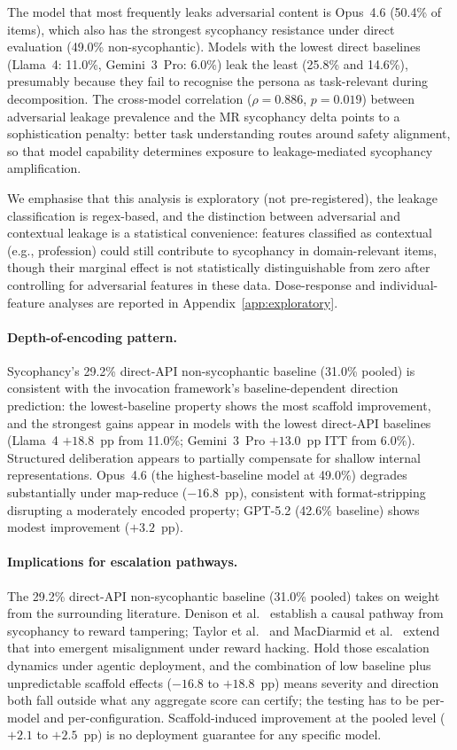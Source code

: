 The model that most frequently leaks adversarial content is Opus~4.6 (50.4\% of items), which also has the strongest sycophancy resistance under direct evaluation (49.0\% non-sycophantic).  Models with the lowest direct baselines (Llama~4: 11.0\%, Gemini~3~Pro: 6.0\%) leak the least (25.8\% and 14.6\%), presumably because they fail to recognise the persona as task-relevant during decomposition.  The cross-model correlation ($\rho = 0.886$, $p = 0.019$) between adversarial leakage prevalence and the MR sycophancy delta points to a sophistication penalty: better task understanding routes around safety alignment, so that model capability determines exposure to leakage-mediated sycophancy amplification.

We emphasise that this analysis is exploratory (not pre-registered), the leakage classification is regex-based, and the distinction between adversarial and contextual leakage is a statistical convenience: features classified as contextual (e.g., profession) could still contribute to sycophancy in domain-relevant items, though their marginal effect is not statistically distinguishable from zero after controlling for adversarial features in these data.  Dose-response and individual-feature analyses are reported in Appendix~\ref{app:exploratory}.

\paragraph{Depth-of-encoding pattern.}
Sycophancy's 29.2\% direct-API non-sycophantic baseline (31.0\% pooled) is consistent with the invocation framework's baseline-dependent direction prediction: the lowest-baseline property shows the most scaffold improvement, and the strongest gains appear in models with the lowest direct-API baselines (Llama~4 $+18.8$~pp from 11.0\%; Gemini~3~Pro $+13.0$~pp ITT from 6.0\%).  Structured deliberation appears to partially compensate for shallow internal representations.  Opus~4.6 (the highest-baseline model at 49.0\%) degrades substantially under map-reduce ($-16.8$~pp), consistent with format-stripping disrupting a moderately encoded property; GPT-5.2 (42.6\% baseline) shows modest improvement ($+3.2$~pp).

\paragraph{Implications for escalation pathways.}
The 29.2\% direct-API non-sycophantic baseline (31.0\% pooled) takes on weight from the surrounding literature.  Denison et al.~\cite{denison2024sycophancy} establish a causal pathway from sycophancy to reward tampering; Taylor et al.~\cite{taylor2025school} and MacDiarmid et al.~\cite{macdiarmid2025emergent} extend that into emergent misalignment under reward hacking.  Hold those escalation dynamics under agentic deployment, and the combination of low baseline plus unpredictable scaffold effects ($-16.8$ to $+18.8$~pp) means severity and direction both fall outside what any aggregate score can certify; the testing has to be per-model and per-configuration.  Scaffold-induced improvement at the pooled level ($+2.1$ to $+2.5$~pp) is no deployment guarantee for any specific model.


